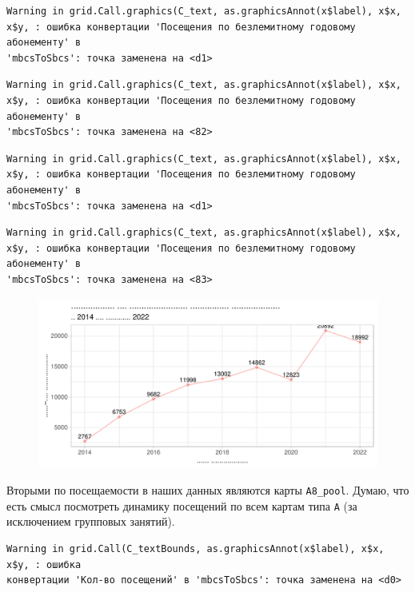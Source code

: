 \documentclass[
  letterpaper,
  DIV=11,
  numbers=noendperiod]{scrreprt}
\begin{document}
\begin{verbatim}
Warning in grid.Call.graphics(C_text, as.graphicsAnnot(x$label), x$x,
x$y, : ошибка конвертации 'Посещения по безлемитному годовому абонементу' в
'mbcsToSbcs': точка заменена на <d1>
\end{verbatim}

\begin{verbatim}
Warning in grid.Call.graphics(C_text, as.graphicsAnnot(x$label), x$x,
x$y, : ошибка конвертации 'Посещения по безлемитному годовому абонементу' в
'mbcsToSbcs': точка заменена на <82>
\end{verbatim}

\begin{verbatim}
Warning in grid.Call.graphics(C_text, as.graphicsAnnot(x$label), x$x,
x$y, : ошибка конвертации 'Посещения по безлемитному годовому абонементу' в
'mbcsToSbcs': точка заменена на <d1>
\end{verbatim}

\begin{verbatim}
Warning in grid.Call.graphics(C_text, as.graphicsAnnot(x$label), x$x,
x$y, : ошибка конвертации 'Посещения по безлемитному годовому абонементу' в
'mbcsToSbcs': точка заменена на <83>
\end{verbatim}

\begin{figure}

{\centering \includegraphics{./intro_files/figure-pdf/unnamed-chunk-9-1.pdf}

}

\end{figure}

Вторыми по посещаемости в наших данных являются карты \texttt{А8\_pool}.
Думаю, что есть смысл посмотреть динамику посещений по всем картам типа
\texttt{А} (за исключением групповых занятий).

\begin{verbatim}
Warning in grid.Call(C_textBounds, as.graphicsAnnot(x$label), x$x, x$y, : ошибка
конвертации 'Кол-во посещений' в 'mbcsToSbcs': точка заменена на <d0>
\end{verbatim}
\end{document}
